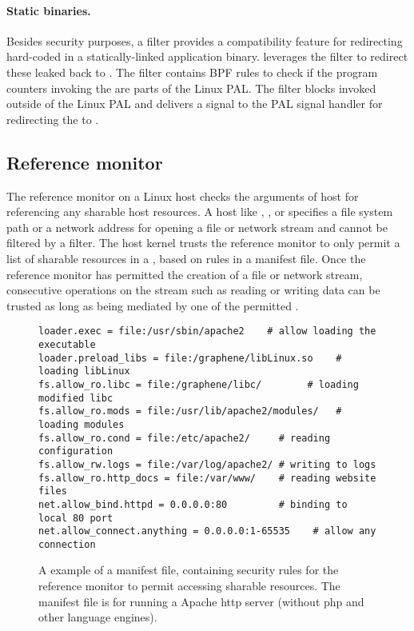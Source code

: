 \paragraph{Static binaries.}
Besides security purposes,
a \seccomp{} filter provides a compatibility feature
for redirecting hard-coded \linuxapis{}
in a statically-linked application binary.
\graphene{} leverages the \seccomp{} filter to redirect these leaked \linuxapis{}
back to \thelibos{}. 
The filter contains BPF rules to check if the program counters
invoking the \linuxapis{}
are parts of the Linux PAL.
The filter blocks \linuxapi{} invoked outside of the Linux PAL
and delivers a  signal
to the PAL signal handler for redirecting the \linuxapis{} to \thelibos{}.



\subsection{Reference monitor}
\label{sec:linux:security:ref-monitor}

The reference monitor on a Linux host
checks the arguments of host \linuxapis{} for referencing any sharable host resources.
A host \linuxapi{} like , , or 
specifies a file system path or a network address
for opening a file or network stream and cannot be filtered by a \seccomp{} filter.
The host kernel trusts the reference monitor
to only permit
a list of sharable resources in a \picoproc{},
based on
rules in a manifest file.
Once the reference monitor has permitted the creation of a file or network stream,
consecutive operations on the stream
such as reading or writing data can be trusted
as long as being mediated by one of the permitted \linuxapis{}.


\begin{figure}
\centering
\begin{lstlisting}
loader.exec = file:/usr/sbin/apache2    # allow loading the executable 
loader.preload_libs = file:/graphene/libLinux.so    # loading libLinux
fs.allow_ro.libc = file:/graphene/libc/        # loading modified libc
fs.allow_ro.mods = file:/usr/lib/apache2/modules/   # loading modules
fs.allow_ro.cond = file:/etc/apache2/     # reading configuration
fs.allow_rw.logs = file:/var/log/apache2/ # writing to logs
fs.allow_ro.http_docs = file:/var/www/    # reading website files
net.allow_bind.httpd = 0.0.0.0:80         # binding to local 80 port
net.allow_connect.anything = 0.0.0.0:1-65535    # allow any connection
\end{lstlisting}
\caption{A example of a manifest file, containing security rules for the reference monitor to permit accessing sharable resources. The manifest file is for running a Apache http server (without php and other language engines).}
\label{fig:linux:manifest-example}
\end{figure}


